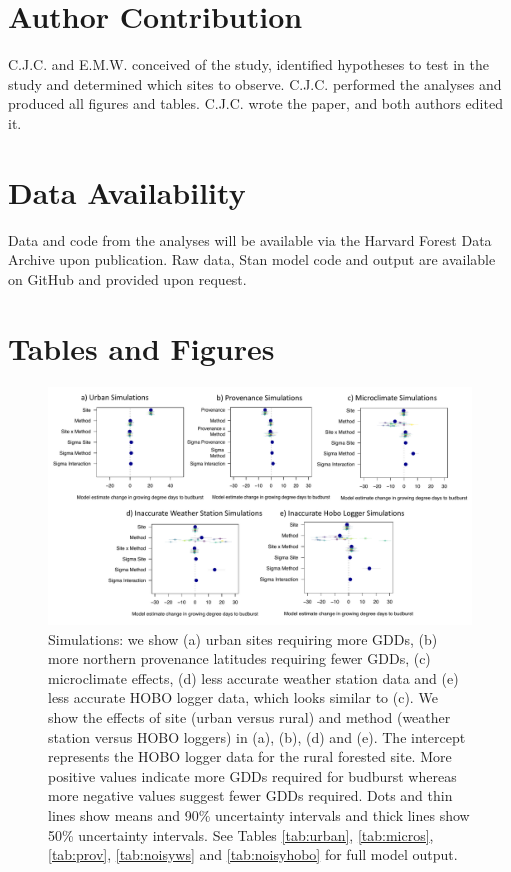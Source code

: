 \documentclass{article}\usepackage[]{graphicx}\usepackage[]{color}
\begin{document}
\section*{Author Contribution} 
C.J.C. and E.M.W. conceived of the study, identified hypotheses to test in the study and determined which sites to observe. C.J.C. performed the analyses and produced all figures and tables. C.J.C. wrote the paper, and both authors edited it.

\section*{Data Availability}
Data and code from the analyses will be available via the Harvard Forest Data Archive upon publication. Raw data, {Stan} model code and output are available on GitHub and provided upon request.




\section*{Tables and Figures}

\begin{figure}[H]
      \centering
      \includegraphics[width=16cm]{..//analyses/figures/muplot_sims.pdf}
\caption{ Simulations: we show (a) urban sites requiring more GDDs, (b) more northern provenance latitudes requiring fewer GDDs, (c) microclimate effects, (d) less accurate weather station data and (e) less accurate HOBO logger data, which looks similar to (c). We show the effects of site (urban versus rural) and method (weather station versus HOBO loggers) in (a), (b), (d) and (e). The intercept represents the HOBO logger data for the rural forested site. More positive values indicate more GDDs required for budburst whereas more negative values suggest fewer GDDs required. Dots and thin lines show means and 90\% uncertainty intervals and thick lines show 50\% uncertainty intervals. See Tables \ref{tab:urban}, \ref{tab:micros}, \ref{tab:prov}, \ref{tab:noisyws} and \ref{tab:noisyhobo} for full model output. } 
\label{fig:musims}
\end{figure}
\end{document}

